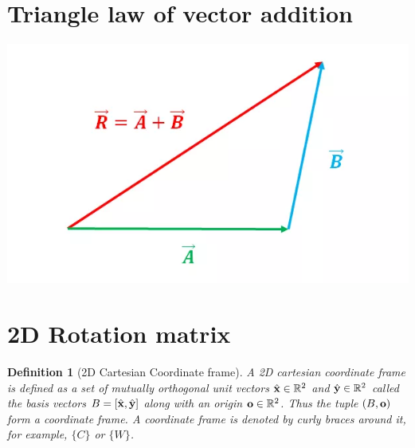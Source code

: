 \documentclass[twocolumn]{article}
\newtheorem{defn}{Definition}
\begin{document}
\section{Triangle law of vector addition}
\includegraphics[width=\linewidth]{media/triangle-law.png}

\section{2D  Rotation matrix}
\begin{defn}[2D  Cartesian Coordinate frame]
 A 2D cartesian coordinate  frame  is defined as a set of mutually orthogonal unit
 vectors  $\hat{\mathbf{x}} \in  \mathbb{R}^2$  and
 $\hat{\mathbf{y}}\in  \mathbb{R}^2 $ called the basis vectors $B = [\hat{\mathbf{x}}, \hat{\mathbf{y}}]$
 along  with  an origin  $\mathbf{o}\in  \mathbb{R}^2$. Thus the tuple  $(B, \mathbf{o})$ form a
 coordinate frame. A  coordinate  frame is denoted  by curly braces around it,
 for  example, $\{C\}$ or $\{W\}$.
\end{defn}
\end{document}
